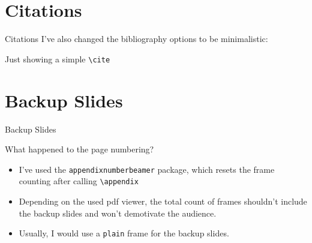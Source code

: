 \documentclass{beamer}
\begin{document}
\section{Citations}
\begin{frame}{Citations}
    I've also changed the bibliography options to be minimalistic:

    Just showing a simple \texttt{\textbackslash{}cite} \cite{AlexNet}
    \vfill
    \printbibliography
\end{frame}

\appendix %
\section*{Backup Slides}
\begin{frame}
    \centering
    \vfill
    {\fontsize{40}{50}\selectfont Backup Slides}
    \vfill
\end{frame}

\begin{frame}{What happened to the page numbering?}
    \begin{itemize}
        \item I've used the \texttt{appendixnumberbeamer}
              package, which resets the frame counting after calling
              \texttt{\textbackslash{}appendix}
        \item Depending on the used pdf viewer, the total
              count of frames shouldn't include the backup slides and
              won't demotivate the audience.
        \item Usually, I would use a \texttt{plain} frame
              for the backup slides.
    \end{itemize}
\end{frame}
\end{document}
